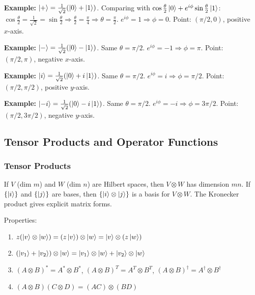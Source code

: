 \documentclass[10pt,a4paper]{article}
\begin{document}
\textbf{Example:} $\ket{+}=\frac{1}{\sqrt{2}}(\ket{0}+\ket{1})$. Comparing with $\cos\frac{\theta}{2}\ket{0}+e^{i\phi}\sin\frac{\theta}{2}\ket{1}$:
$\cos\frac{\theta}{2}=\frac{1}{\sqrt{2}}=\sin\frac{\theta}{2}\Rightarrow\frac{\theta}{2}=\frac{\pi}{4}\Rightarrow\theta=\frac{\pi}{2}$. $e^{i\phi}=1\Rightarrow\phi=0$. Point: $(\pi/2,0)$, positive $x$-axis.

\textbf{Example:} $\ket{-}=\frac{1}{\sqrt{2}}(\ket{0}-\ket{1})$. Same $\theta=\pi/2$. $e^{i\phi}=-1\Rightarrow\phi=\pi$. Point: $(\pi/2,\pi)$, negative $x$-axis.

\textbf{Example:} $\ket{i}=\frac{1}{\sqrt{2}}(\ket{0}+i\ket{1})$. Same $\theta=\pi/2$. $e^{i\phi}=i\Rightarrow\phi=\pi/2$. Point: $(\pi/2,\pi/2)$, positive $y$-axis.

\textbf{Example:} $\ket{-i}=\frac{1}{\sqrt{2}}(\ket{0}-i\ket{1})$. Same $\theta=\pi/2$. $e^{i\phi}=-i\Rightarrow\phi=3\pi/2$. Point: $(\pi/2,3\pi/2)$, negative $y$-axis.

\subsection{Tensor Products and Operator Functions}

\subsubsection*{Tensor Products}

\begin{tcolorbox}[defstyle, title={Definition: Tensor Product}]
If $V$ (dim $m$) and $W$ (dim $n$) are Hilbert spaces, then $V\otimes W$ has dimension $mn$. If $\{\ket{i}\}$ and $\{\ket{j}\}$ are bases, then $\{\ket{i}\otimes\ket{j}\}$ is a basis for $V\otimes W$. The Kronecker product gives explicit matrix forms.

Properties:
\begin{enumerate}[nosep]
\item $z(\ket{v}\otimes\ket{w})=(z\ket{v})\otimes\ket{w}=\ket{v}\otimes(z\ket{w})$
\item $(\ket{v_1}+\ket{v_2})\otimes\ket{w}=\ket{v_1}\otimes\ket{w}+\ket{v_2}\otimes\ket{w}$
\item $(A\otimes B)^*=A^*\otimes B^*$,\; $(A\otimes B)^T=A^T\otimes B^T$,\; $(A\otimes B)^\dagger=A^\dagger\otimes B^\dagger$
\item $(A\otimes B)(C\otimes D)=(AC)\otimes(BD)$
\end{enumerate}
\end{tcolorbox}
\end{document}
